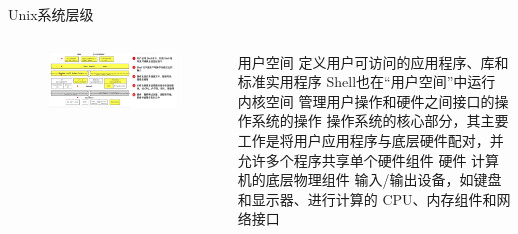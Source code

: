 \begin{frame}{Unix系统层级}
    \begin{columns}
        \begin{figure}
            \centering
            \includegraphics[width=1\textwidth]{Images/linux_work_order.png}
        \end{figure}
        \begin{myoutline}
            \1 用户空间
                \2 定义用户可访问的应用程序、库和标准实用程序
                \2 Shell也在``用户空间''中运行
            \1 内核空间
                \2 管理用户操作和硬件之间接口的操作系统的操作
                \2 操作系统的核心部分，其主要工作是将用户应用程序与底层硬件配对，并允许多个程序共享单个硬件组件
            \1 硬件
                \2 计算机的底层物理组件
                \2 输入/​​输出设备，如键盘和显示器、进行计算的 CPU、内存组件和网络接口
        \end{myoutline}
    \end{columns}

\end{frame}




